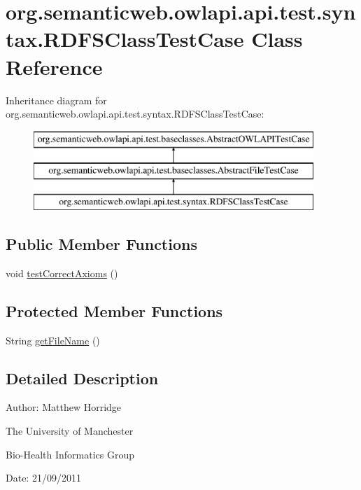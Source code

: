 \hypertarget{classorg_1_1semanticweb_1_1owlapi_1_1api_1_1test_1_1syntax_1_1_r_d_f_s_class_test_case}{\section{org.\-semanticweb.\-owlapi.\-api.\-test.\-syntax.\-R\-D\-F\-S\-Class\-Test\-Case Class Reference}
\label{classorg_1_1semanticweb_1_1owlapi_1_1api_1_1test_1_1syntax_1_1_r_d_f_s_class_test_case}
}
Inheritance diagram for org.\-semanticweb.\-owlapi.\-api.\-test.\-syntax.\-R\-D\-F\-S\-Class\-Test\-Case\-:\begin{figure}[H]
\begin{center}
\leavevmode
\includegraphics[height=3.000000cm]{classorg_1_1semanticweb_1_1owlapi_1_1api_1_1test_1_1syntax_1_1_r_d_f_s_class_test_case}
\end{center}
\end{figure}
\subsection*{Public Member Functions}
\begin{DoxyCompactItemize}
\item 
void \hyperlink{classorg_1_1semanticweb_1_1owlapi_1_1api_1_1test_1_1syntax_1_1_r_d_f_s_class_test_case_ad467481273ed348c094597bad60abe19}{test\-Correct\-Axioms} ()
\end{DoxyCompactItemize}
\subsection*{Protected Member Functions}
\begin{DoxyCompactItemize}
\item 
String \hyperlink{classorg_1_1semanticweb_1_1owlapi_1_1api_1_1test_1_1syntax_1_1_r_d_f_s_class_test_case_a40930d87bb05720d2c09e0a5845a00a7}{get\-File\-Name} ()
\end{DoxyCompactItemize}


\subsection{Detailed Description}
Author\-: Matthew Horridge\par
 The University of Manchester\par
 Bio-\/\-Health Informatics Group\par
 Date\-: 21/09/2011 


